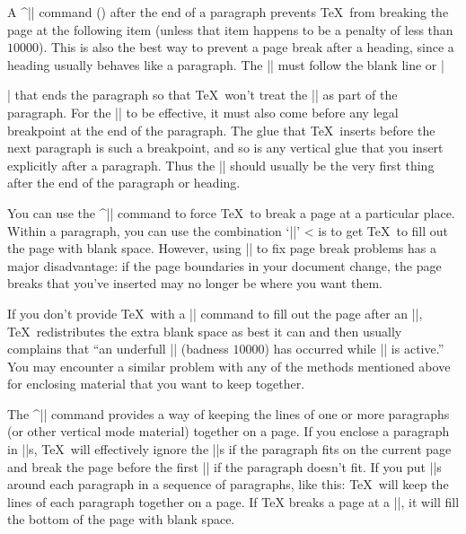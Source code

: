 A ^|\nobreak| command  ()
after the end of a paragraph prevents \TeX\
from breaking the page at the following item
(unless that item happens to be a penalty of less than $10000$).
This is also the best way to prevent a page break after a heading,
since a heading usually behaves like a paragraph.
The |\nobreak| must follow the blank line or |\par| that ends
the paragraph so that \TeX\ won't treat the |\nobreak| as part of the
paragraph.
For the |\nobreak| to be effective, it must also come before
any legal breakpoint at the end of the paragraph.
The glue that \TeX\ inserts
before the next paragraph is such a breakpoint,
and so is any vertical glue that you insert explicitly after a paragraph.
Thus the |\nobreak| should usually be
the very first thing after the end of the paragraph or heading.

You can use the ^|\eject| command \ctsref{\eject}
to force \TeX\ to break a page at a
particular place.  Within a paragraph, you can use the combination 
`|\vadjust{\vfill\eject}|' 
\ctsref{\vadjust}
^^| is to
get \TeX\ to fill out the page with blank space.  
However, using |\eject| to fix page break problems
has a major disadvantage:
if the page boundaries in your document change,
the page breaks that you've inserted may no longer be where you want them.

If you don't provide \TeX\ with a |\vfill| command to fill out the page
after an |\eject|,
\TeX\ redistributes the extra blank space as best it can and then usually
complains that ``an
underfull |\vbox| (badness $10000$) has occurred while |\output| is active.''
You may encounter a similar problem with
any of the methods mentioned above for enclosing
material that you want to keep together.

The ^|\filbreak| command \ctsref\filbreak{}
provides a way of keeping the lines of one or more paragraphs
(or other vertical mode material) together on
a page.  If you enclose a paragraph in |\filbreak|s, \TeX\ will effectively
ignore the |\filbreak|s if the paragraph fits on the current page and
break the page before the first |\filbreak| if the paragraph doesn't fit.
If you put |\filbreak|s around each paragraph in a sequence of paragraphs,
like this:
{\obeylines{}}
\vfil\eject
\noindent
\TeX\ will keep the lines of each paragraph together on a page.
If \TeX{} breaks a page at a |\filbreak|, it will fill the bottom of the
page with blank space.


